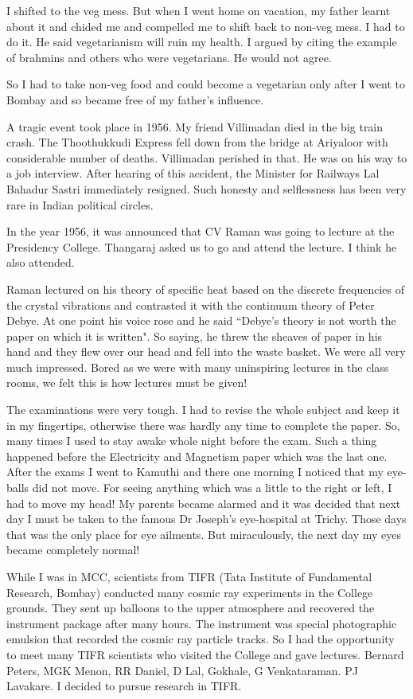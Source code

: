 I shifted to the veg mess. But when I went home on vacation, my father 
learnt about it and chided me and compelled me to shift back to non-veg 
mess. I had to do it. He said vegetarianism will ruin my health. I 
argued by citing the example of brahmins and others who were 
vegetarians. He would not agree.

So I had to take non-veg food and could become a vegetarian only after I 
went to Bombay and so became free of my father's influence.
 
A tragic event took place in 1956. My friend Villimadan died in the big 
train crash. The Thoothukkudi Express fell down from the bridge at 
Ariyaloor with considerable number of deaths. Villimadan perished in 
that. He was on his way to a job interview. After hearing of this 
accident, the Minister for Railways Lal Bahadur Sastri immediately 
resigned. Such honesty and selflessness has been very rare in Indian 
political circles.

In the year 1956, it was announced that CV Raman was going to lecture at 
the Presidency College. Thangaraj asked us to go and attend the lecture. 
I think he also attended.

Raman lectured on his theory of specific heat based on the discrete 
frequencies of the crystal vibrations and contrasted it with the 
continuum theory of Peter Debye. At one point his voice rose and he said 
``Debye's theory is not worth the paper on which it is written". So 
saying, he threw the sheaves of paper in his hand and they flew over our 
head and fell into the waste basket. We were all very much impressed. 
Bored as we were with many uninspiring lectures in the class rooms, we 
felt this is how lectures must be given!

The examinations were very tough. I had to revise the whole subject and 
keep it in my fingertips, otherwise there was hardly any time to 
complete the paper. So, many times I used to stay awake whole night 
before the exam. Such a thing happened before the Electricity and 
Magnetism paper which was the last one. After the exams I went to 
Kamuthi and there one morning I noticed that my eye-balls did not move. 
For seeing anything which was a little to the right or left, I had to 
move my head! My parents became alarmed and it was decided that next day 
I must be taken to the famous Dr Joseph's eye-hospital at Trichy. Those 
days that was the only place for eye ailments. But miraculously, the 
next day my eyes became completely normal!

While I was in MCC, scientists from TIFR (Tata Institute of Fundamental 
Research, Bombay) conducted many cosmic ray experiments in the College 
grounds. They sent up balloons to the upper atmosphere and recovered the 
instrument package after many hours. The instrument was special 
photographic emulsion that recorded the cosmic ray particle tracks. So I 
had the opportunity to meet many TIFR scientists who visited the College 
and gave lectures. Bernard Peters, MGK Menon, RR Daniel, D Lal, Gokhale, 
G Venkataraman. PJ Lavakare. I decided to pursue research in TIFR.

